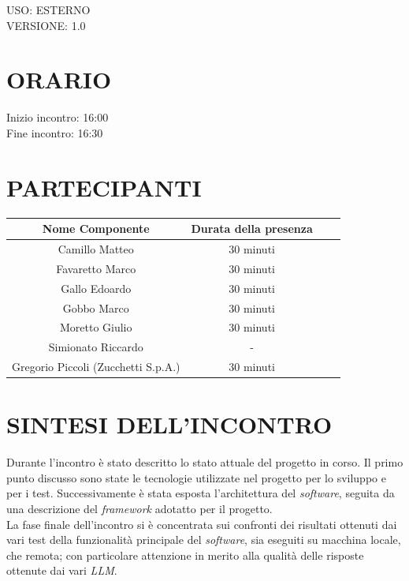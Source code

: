 \documentclass[5pt]{article}
\begin{document}
\begin{flushright}
    \begin{spacing}{1}
        USO: ESTERNO\\
        VERSIONE: 1.0\\
    \end{spacing}
\end{flushright}


\restoregeometry

\pagebreak


\section{ORARIO}
\begin{spacing}{1.5}
    {\large Inizio incontro: 16:00}\\
    {\large Fine incontro: 16:30} 
\end{spacing}

\section{PARTECIPANTI}
\setlength\cellspacetoplimit{6pt}
\setlength\cellspacebottomlimit{6pt}

\begin{table}[ht]
  \begin{tabular}{|Sc|Sc|}
    \hline
    \textbf{Nome Componente} & \textbf{Durata della presenza} \\
    \hline
    Camillo Matteo & 30 minuti \\
    Favaretto Marco & 30 minuti \\
    Gallo Edoardo & 30 minuti \\
    Gobbo Marco & 30 minuti \\
    Moretto Giulio & 30 minuti \\
    Simionato Riccardo & - \\
    Gregorio Piccoli (Zucchetti S.p.A.) & 30 minuti \\
    \hline
  \end{tabular}
  \label{tab:conference}
\end{table}

\section{SINTESI DELL'INCONTRO}
Durante l'incontro è stato descritto lo stato attuale del progetto in corso. 
Il primo punto discusso sono state le tecnologie utilizzate nel progetto per lo sviluppo e per i test.
Successivamente è stata esposta l'architettura del \textit{software}, seguita da una descrizione del \textit{framework} adotatto per il progetto. \\
La fase finale dell'incontro si è concentrata sui confronti dei risultati ottenuti dai vari test della funzionalità principale del \textit{software}, sia eseguiti su macchina locale, che remota; con particolare attenzione in merito alla qualità delle risposte ottenute dai vari \textit{LLM}.
\end{document}
